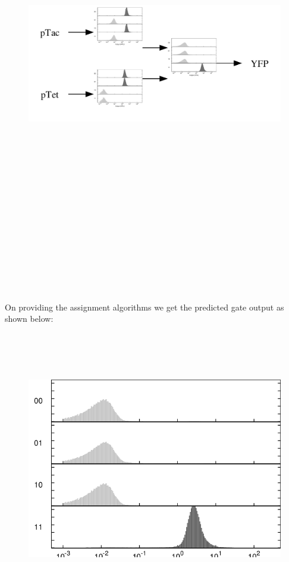 \documentclass[11pt]{article}
\begin{document}
\begin{figure}[ht!]
\centering
\includegraphics[width=16cm,height=16cm,keepaspectratio]{download (2).png}
\label{Case exmaple}
\end{figure}
\\[\baselineskip]   \\[\baselineskip]   \\[\baselineskip]   \\[\baselineskip]   
On providing the assignment algorithms we get the predicted gate output as shown below:
\begin{figure}[ht!]
\centering
\includegraphics[width=12cm,height=12cm,keepaspectratio]{download (3).png}
\label{Case exmaple}
\end{figure}
\end{document}
